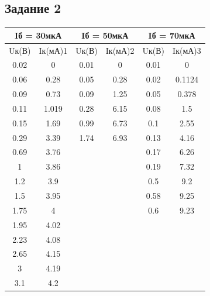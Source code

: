 \documentclass[a4paper,14pt]{article}
\begin{document}
\subsection{ Задание 2}

\begin{table}[H]
	\begin{tabular}{|c|c|c|c|c|c|}
		\hline
		\multicolumn{2}{|c|}{Iб = 30мкА} & \multicolumn{2}{c|}{Iб = 50мкА} & \multicolumn{2}{c|}{Iб = 70мкА} \\ \hline
		Uк(В)          & Iк(мА)1         & Uк(В)         & Iк(мА)2         & Uк(В)         & Iк(мА)3         \\ \hline
		0.02           & 0               & 0.01          & 0               & 0.01          & 0               \\ \hline
		0.06           & 0.28            & 0.05          & 0.28            & 0.02          & 0.1124          \\ \hline
		0.09           & 0.73            & 0.09          & 1.25            & 0.05          & 0.378           \\ \hline
		0.11           & 1.019           & 0.28          & 6.15            & 0.08          & 1.5             \\ \hline
		0.15           & 1.69            & 0.99          & 6.73            & 0.1           & 2.55            \\ \hline
		0.29           & 3.39            & 1.74          & 6.93            & 0.13          & 4.16            \\ \hline
		0.69           & 3.76            &               &                 & 0.17          & 6.26            \\ \hline
		1              & 3.86            &               &                 & 0.19          & 7.32            \\ \hline
		1.2            & 3.9             &               &                 & 0.5           & 9.2             \\ \hline
		1.5            & 3.95            &               &                 & 0.58          & 9.25            \\ \hline
		1.75           & 4               &               &                 & 0.6           & 9.23            \\ \hline
		1.95           & 4.02            &               &                 &               &                 \\ \hline
		2.23           & 4.08            &               &                 &               &                 \\ \hline
		2.65           & 4.15            &               &                 &               &                 \\ \hline
		3              & 4.19            &               &                 &               &                 \\ \hline
		3.1            & 4.2             &               &                 &               &                 \\ \hline
	\end{tabular}
\end{table}
\end{document}
